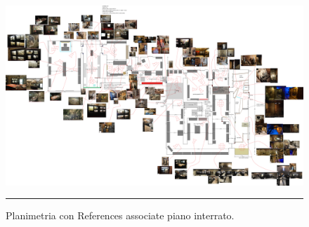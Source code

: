 \documentclass[10pt, openany]{article}
\begin{document}
  \begin{landscape}\begin{figure}[p]
    \centering
    \begin{mdframed}[
      linecolor=black,
      linewidth=1pt,
      innertopmargin=6pt,
      innerbottommargin=6pt,
      innerleftmargin=6pt,
      innerrightmargin=6pt
    ]
    \includegraphics[width=0.85\paperheight]{museo_planimetria_piano_interrato.png}
    \vspace{3pt}
    \hrule
    \vspace{6pt}
    \caption{Planimetria con References associate piano interrato.}
    \end{mdframed}
  \end{figure}\end{landscape}
  \FloatBarrier
\end{document}
